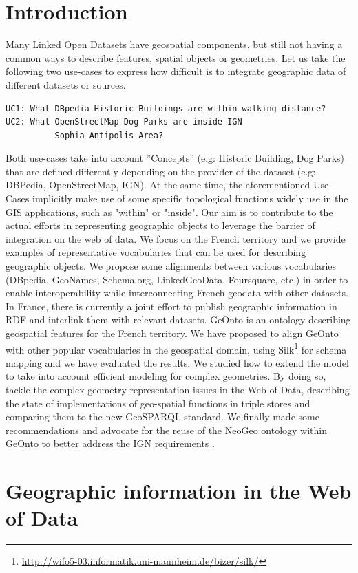 \documentclass[a4paper,11pt]{report}
\begin{document}
\section{Introduction}
 Many Linked Open Datasets have geospatial components, but still not having a common ways to describe features, spatial objects or geometries. Let us take the following two use-cases to express how difficult is to integrate geographic data of different datasets or sources. 
\begin{verbatim}
UC1: What DBpedia Historic Buildings are within walking distance?
UC2: What OpenStreetMap Dog Parks are inside IGN
          Sophia-Antipolis Area?
\end{verbatim} 
 Both use-cases take into account ''Concepts'' (e.g: Historic Building, Dog Parks) that are defined differently depending on the provider of the dataset (e.g: DBPedia, OpenStreetMap, IGN). At the same time, the aforementioned Use-Cases implicitly make use of some specific topological functions widely use in the GIS applications, such as "within" or "inside". Our aim is to contribute to the actual efforts in representing geographic objects to leverage the barrier of integration on the web of data. We focus on the French territory and we provide examples of representative vocabularies that can be used for describing geographic objects. We propose some alignments between various vocabularies (DBpedia, GeoNames, Schema.org, LinkedGeoData, Foursquare, etc.) in order to enable interoperability while interconnecting French geodata with other datasets. In France, there is  currently a joint effort to publish geographic information in RDF  and interlink them with relevant datasets. GeOnto is an ontology describing geospatial features for the French territory. We have proposed to align GeOnto with other popular vocabularies in the geospatial domain, using Silk\footnote{\url{http://wifo5-03.informatik.uni-mannheim.de/bizer/silk/}} for schema mapping and we have evaluated the results. We studied how to extend the model to take into account efficient modeling for complex geometries. By doing so, tackle the complex geometry representation issues in the Web of Data, describing the state of implementations of geo-spatial functions in triple stores and comparing them to the new GeoSPARQL standard.  We finally made some recommendations and advocate for the reuse of the NeoGeo ontology within GeOnto to better address the IGN requirements \cite{atemezing2012b}.


\section{Geographic information in the Web of Data}                         \label{sec:geo-in-web-of-data}
\end{document}
